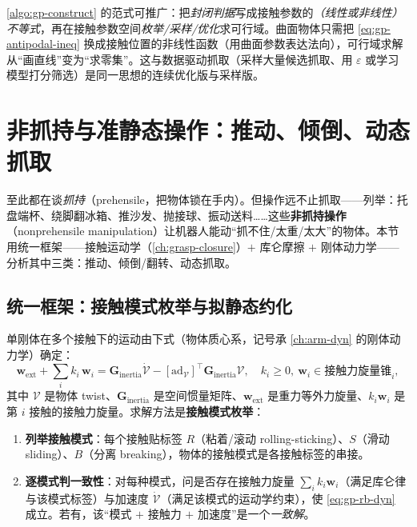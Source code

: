 \begin{insight}
\cref{algo:gp-construct} 的范式可推广：把\emph{封闭判据}写成接触参数的\emph{（线性或非线性）不等式}，再在接触参数空间\emph{枚举/采样/优化}求可行域。曲面物体只需把 \cref{eq:gp-antipodal-ineq} 换成接触位置的非线性函数（用曲面参数表达法向），可行域求解从“画直线”变为“求零集”。这与数据驱动抓取（采样大量候选抓取、用 $\varepsilon$ 或学习模型打分筛选）是同一思想的连续优化版与采样版。
\end{insight}

\section{非抓持与准静态操作：推动、倾倒、动态抓取}
\label{sec:gp-nonprehensile}

至此都在谈\emph{抓持}（prehensile，把物体锁在手内）。但操作远不止抓取——\citeauthor{lynch2017modern}\cite{lynch2017modern}列举：托盘端杯、绕脚翻冰箱、推沙发、抛接球、振动送料……这些\textbf{非抓持操作}（nonprehensile manipulation）让机器人能动“抓不住/太重/太大”的物体。本节用统一框架——接触运动学（\cref{ch:grasp-closure}）$+$ 库仑摩擦 $+$ 刚体动力学——分析其中三类：推动、倾倒/翻转、动态抓取。

\subsection{统一框架：接触模式枚举与拟静态约化}
单刚体在多个接触下的运动由下式（物体质心系，记号承 \cref{ch:arm-dyn} 的刚体动力学）确定\cite{lynch2017modern}：
\begin{equation}
  \mathbf{w}_{\text{ext}}+\sum_i k_i\,\mathbf{w}_i=\mathbf{G}_{\text{inertia}}\dot{\boldsymbol{\mathcal{V}}}-[\mathrm{ad}_{\boldsymbol{\mathcal{V}}}]^\top\mathbf{G}_{\text{inertia}}\boldsymbol{\mathcal{V}},
  \quad k_i\ge 0,\ \mathbf{w}_i\in\text{接触力旋量锥}_i,
  \label{eq:gp-rb-dyn}
\end{equation}
其中 $\boldsymbol{\mathcal{V}}$ 是物体 twist、$\mathbf{G}_{\text{inertia}}$ 是空间惯量矩阵、$\mathbf{w}_{\text{ext}}$ 是重力等外力旋量、$k_i\mathbf{w}_i$ 是第 $i$ 接触的接触力旋量。求解方法是\textbf{接触模式枚举}：

\begin{algo}\label{algo:gp-contact-mode}
\hfill
\begin{enumerate}
  \item \textbf{列举接触模式}：每个接触贴标签 $R$（粘着/滚动 rolling-sticking）、$S$（滑动 sliding）、$B$（分离 breaking），物体的接触模式是各接触标签的串接。
  \item \textbf{逐模式判一致性}：对每种模式，问是否存在接触力旋量 $\sum_i k_i\mathbf{w}_i$（满足库仑律与该模式标签）与加速度 $\dot{\boldsymbol{\mathcal{V}}}$（满足该模式的运动学约束），使 \cref{eq:gp-rb-dyn} 成立。若有，该“模式 $+$ 接触力 $+$ 加速度”是一个\emph{一致解}。
\end{enumerate}
\end{algo}

